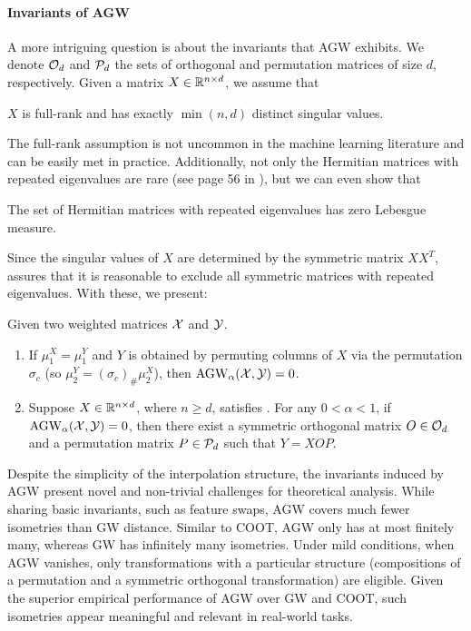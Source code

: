 \paragraph{Invariants of AGW}
A more intriguing question is about the invariants that AGW exhibits.
We denote $\mathcal O_d$ and $\mathcal P_d$ the sets of orthogonal and permutation matrices of size $d$,
respectively. Given a matrix $X \in \mathbb R^{n \times d}$, we assume that
\begin{assumption}
    \label{assumption:1}
    $X$ is full-rank and has exactly $\min(n, d)$ distinct singular values.
\end{assumption}
The full-rank assumption is not uncommon in the machine learning literature \citep{Kenji19}
and can be easily met in practice. Additionally,
not only the Hermitian matrices with repeated eigenvalues are rare (see page 56 in \citep{Tao12}),
but we can even show that
\begin{corollary}
\label{corr:hermitian}
    The set of Hermitian matrices with repeated eigenvalues has zero Lebesgue measure.
\end{corollary}
Since the singular values of $X$ are determined by the symmetric matrix $X X^T$,
 assures that it is reasonable to exclude all symmetric matrices
with repeated eigenvalues. With these, we present:
\begin{theorem}
\label{thm:invariant}
Given two weighted matrices $\mathcal X$ and $\mathcal Y$.
\begin{enumerate}
    \item If $\mu_1^X = \mu_1^Y$ and $Y$ is obtained by permuting columns of
    $X$ via the permutation $\sigma_c$ (so $\mu_2^Y = (\sigma_c)_{\#} \mu_2^X$),
    then $\text{AGW}_{\alpha}(\mathcal X, \mathcal Y) = 0$.
    \item Suppose $X \in \mathbb R^{n \times d}$, where $n \geq d$, satisfies .
    For any $0 < \alpha < 1$, if $\text{AGW}_{\alpha}(\mathcal X, \mathcal Y) = 0$,
    then there exist a symmetric orthogonal matrix $O \in \mathcal O_d$ and
    a permutation matrix $P \in \mathcal P_d$ such that $Y = X OP$.
\end{enumerate}
\end{theorem}
Despite the simplicity of the interpolation structure, the invariants induced by AGW
present novel and non-trivial challenges for theoretical analysis.
While sharing basic invariants, such as feature swaps, AGW covers much fewer isometries than
GW distance. Similar to COOT, AGW only has at most finitely many, whereas GW has infinitely many isometries.
Under mild conditions, when AGW vanishes, only transformations with a particular structure
(compositions of a permutation and a symmetric orthogonal transformation) are eligible.
Given the superior empirical performance of AGW over GW and COOT, such isometries appear
meaningful and relevant in real-world tasks.

